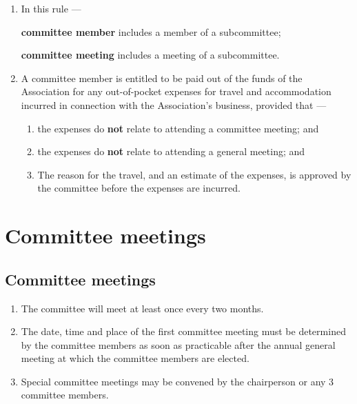 \documentclass[../constitution.tex]{subfiles}
\begin{document}
\begin{enumerate}

\item In this rule ---

\textbf{committee member} includes a member of a subcommittee;

\textbf{committee meeting} includes a meeting of a subcommittee.

\item A committee member is entitled to be paid out of the funds of the Association for any out-of-pocket expenses for travel and accommodation incurred in connection with the Association's business, provided that ---

  \begin{enumerate}
  
  \item the expenses do \textbf{not} relate to attending a committee meeting; and 
  \item the expenses do \textbf{not} relate to attending a general meeting; and 
  \item The reason for the travel, and an estimate of the expenses, is approved by the committee before the expenses are incurred.
  \end{enumerate}
\end{enumerate}




\hypertarget{division-4-committee-meetings}{%
\section{Committee meetings}\label{division-4-committee-meetings}}

\hypertarget{committee-meetings}{%
\subsection{Committee meetings}\label{committee-meetings}}

\begin{enumerate}

\item The committee will meet at least once every two months.
\item \label{first-committee-meeting} The date, time and place of the first committee meeting must be determined by the committee members as soon as practicable after the annual general meeting at which the committee members are elected.


\item Special committee meetings may be convened by the chairperson or any 3 committee members.
\end{enumerate}
\end{document}
